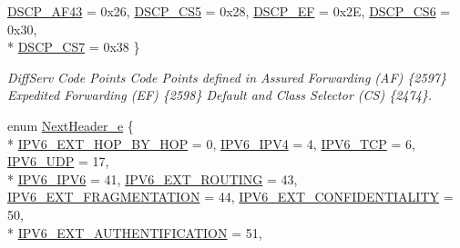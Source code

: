 \begin{DoxyCompactItemize}
\hyperlink{classns3_1_1Ipv6Header_afdc89ed9acd990a7613782323e4c95eea17f9516e4d622d1d897d6403c9dfab80}{D\+S\+C\+P\+\_\+\+A\+F43} = 0x26, 
\hyperlink{classns3_1_1Ipv6Header_afdc89ed9acd990a7613782323e4c95eead364f05de5efaa46b961255865a8bf94}{D\+S\+C\+P\+\_\+\+C\+S5} = 0x28, 
\hyperlink{classns3_1_1Ipv6Header_afdc89ed9acd990a7613782323e4c95eeac251fb08fc5b74f674c749280643ace1}{D\+S\+C\+P\+\_\+\+EF} = 0x2E, 
\hyperlink{classns3_1_1Ipv6Header_afdc89ed9acd990a7613782323e4c95eeaa929dcffd5ea53ee827428a5040042bd}{D\+S\+C\+P\+\_\+\+C\+S6} = 0x30, 
\\*
\hyperlink{classns3_1_1Ipv6Header_afdc89ed9acd990a7613782323e4c95eea9c9fce68ef927ccff61117b22d711fc5}{D\+S\+C\+P\+\_\+\+C\+S7} = 0x38
 \}\begin{DoxyCompactList}\small\item\em Diff\+Serv Code Points Code Points defined in Assured Forwarding (AF) \{2597\} Expedited Forwarding (EF) \{2598\} Default and Class Selector (CS) \{2474\}. \end{DoxyCompactList}
\item 
enum \hyperlink{classns3_1_1Ipv6Header_a226429221a066c5e3b1f260caf27d1e9}{Next\+Header\+\_\+e} \{ \\*
\hyperlink{classns3_1_1Ipv6Header_a226429221a066c5e3b1f260caf27d1e9aa0413202f88bebb4f91a138e317b6bbd}{I\+P\+V6\+\_\+\+E\+X\+T\+\_\+\+H\+O\+P\+\_\+\+B\+Y\+\_\+\+H\+OP} = 0, 
\hyperlink{classns3_1_1Ipv6Header_a226429221a066c5e3b1f260caf27d1e9aadc0daba7168bd3e89aaf20326118257}{I\+P\+V6\+\_\+\+I\+P\+V4} = 4, 
\hyperlink{classns3_1_1Ipv6Header_a226429221a066c5e3b1f260caf27d1e9adb8d45f53fe038c0ca110d56f5c2a121}{I\+P\+V6\+\_\+\+T\+CP} = 6, 
\hyperlink{classns3_1_1Ipv6Header_a226429221a066c5e3b1f260caf27d1e9aef42146d6b211521c22f827b04530253}{I\+P\+V6\+\_\+\+U\+DP} = 17, 
\\*
\hyperlink{classns3_1_1Ipv6Header_a226429221a066c5e3b1f260caf27d1e9a2438a09074916d0e066627b28543ec7a}{I\+P\+V6\+\_\+\+I\+P\+V6} = 41, 
\hyperlink{classns3_1_1Ipv6Header_a226429221a066c5e3b1f260caf27d1e9a4f6f9116305705bc2b3d04ff5c4bd2a8}{I\+P\+V6\+\_\+\+E\+X\+T\+\_\+\+R\+O\+U\+T\+I\+NG} = 43, 
\hyperlink{classns3_1_1Ipv6Header_a226429221a066c5e3b1f260caf27d1e9a5839daf3fdfb16dfdc94a208ca6ebc5a}{I\+P\+V6\+\_\+\+E\+X\+T\+\_\+\+F\+R\+A\+G\+M\+E\+N\+T\+A\+T\+I\+ON} = 44, 
\hyperlink{classns3_1_1Ipv6Header_a226429221a066c5e3b1f260caf27d1e9a6ce3dab9836ffca395be87f2f94ad686}{I\+P\+V6\+\_\+\+E\+X\+T\+\_\+\+C\+O\+N\+F\+I\+D\+E\+N\+T\+I\+A\+L\+I\+TY} = 50, 
\\*
\hyperlink{classns3_1_1Ipv6Header_a226429221a066c5e3b1f260caf27d1e9a8ab34eab7c2a67bc381b3de3cb3ff067}{I\+P\+V6\+\_\+\+E\+X\+T\+\_\+\+A\+U\+T\+H\+E\+N\+T\+I\+F\+I\+C\+A\+T\+I\+ON} = 51, 

\end{DoxyCompactItemize}
